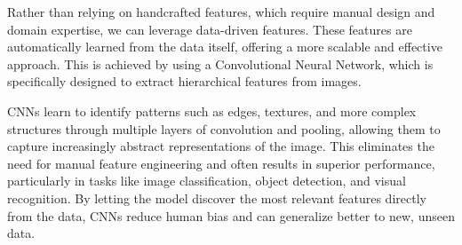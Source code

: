 Rather than relying on handcrafted features, which require manual design and domain expertise, we can leverage data-driven features. 
These features are automatically learned from the data itself, offering a more scalable and effective approach. 
This is achieved by using a Convolutional Neural Network, which is specifically designed to extract hierarchical features from images.

CNNs learn to identify patterns such as edges, textures, and more complex structures through multiple layers of convolution and pooling, allowing them to capture increasingly abstract representations of the image. 
This eliminates the need for manual feature engineering and often results in superior performance, particularly in tasks like image classification, object detection, and visual recognition. 
By letting the model discover the most relevant features directly from the data, CNNs reduce human bias and can generalize better to new, unseen data.